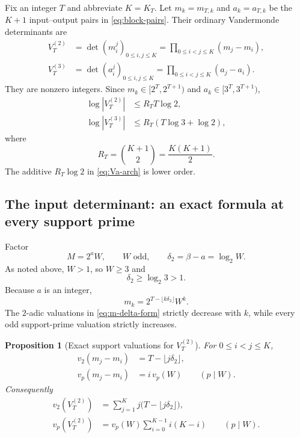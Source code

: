 \documentclass[11pt,oneside]{article}
\newtheorem{proposition}[theorem]{Proposition}
\theoremstyle{definition}
\theoremstyle{remark}
\begin{document}
Fix an integer $T$ and abbreviate $K=K_T$.  Let $m_k=m_{T,k}$ and $a_k=a_{T,k}$ be the
$K+1$ input--output pairs in \eqref{eq:block-pairs}.  Their ordinary Vandermonde determinants
are
\begin{align}
  V_T^{(2)}&=\det(m_i^j)_{0\le i,j\le K}
            =\prod_{0\le i<j\le K}(m_j-m_i),\label{eq:Vm}\\
  V_T^{(3)}&=\det(a_i^j)_{0\le i,j\le K}
            =\prod_{0\le i<j\le K}(a_j-a_i).
  \label{eq:Va}
\end{align}
They are nonzero integers.  Since $m_k\in[2^T,2^{T+1})$ and
$a_k\in[3^T,3^{T+1})$,
\begin{align}
  \log|V_T^{(2)}|&\le R_TT\log2,\label{eq:Vm-arch}\\
  \log|V_T^{(3)}|&\le R_T(T\log3+\log2),\label{eq:Va-arch}
\end{align}
where
\[
  R_T=\binom{K+1}{2}=\frac{K(K+1)}2.
\]
The additive $R_T\log2$ in \eqref{eq:Va-arch} is lower order.

\subsection{The input determinant: an exact formula at every support prime}

Factor
\[
  M=2^aW,
  \qquad W\text{ odd},
  \qquad
  \delta_2=\beta-a=\log_2W.
\]
As noted above, $W>1$, so $W\ge3$ and
\begin{equation}\label{eq:delta2-gt1}
  \delta_2\ge\log_2 3>1.
\end{equation}
Because $a$ is an integer,
\begin{equation}\label{eq:m-delta-form}
  m_k=2^{T-\lfloor k\delta_2\rfloor}W^k.
\end{equation}
The $2$-adic valuations in \eqref{eq:m-delta-form} strictly decrease with $k$, while every
odd support-prime valuation strictly increases.

\begin{proposition}[Exact support valuations for $V_T^{(2)}$]
\label{prop:input-vander-valuations}
For $0\le i<j\le K$,
\begin{align}
  v_2(m_j-m_i)&=T-\lfloor j\delta_2\rfloor,
  \label{eq:v2-gap}\\
  v_p(m_j-m_i)&=i\,v_p(W)
  \qquad(p\mid W).
  \label{eq:vp-gap}
\end{align}
Consequently
\begin{align}
 v_2(V_T^{(2)})
 &=\sum_{j=1}^Kj\bigl(T-\lfloor j\delta_2\rfloor\bigr),
 \label{eq:v2-V}\\
 v_p(V_T^{(2)})
 &=v_p(W)\sum_{i=0}^{K-1}i(K-i)
 \qquad(p\mid W).
 \label{eq:vp-V}
\end{align}
\end{proposition}
\end{document}
